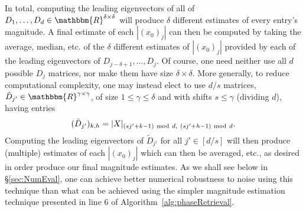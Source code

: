In total, computing the leading eigenvectors of all of $D_1, \dots, D_d \in \mathbbm{R}^{\delta \times \delta}$ will produce $\delta$ different estimates of every entry's magnitude.  A final estimate of each $|(x_0)_j|$ can then be computed by taking the average, median, etc. of the $\delta$ different estimates of $|(x_0)_j|$ provided by each of the leading eigenvectors of $D_{j-\delta+1}, \dots, D_j$.  Of course, one need neither use all $d$ possible $D_j$ matrices, nor make them have size $\delta \times \delta$.  More generally, to reduce computational complexity, one may instead elect to use $d/s$ matrices, $\tilde{D}_{j'} \in \mathbbm{R}^{\gamma \times \gamma}$, of size $1 \leq \gamma \leq \delta$ and with shifts $s \leq \gamma$ (dividing $d$), having entries
$$(\tilde{D}_{j'})_{k,h} = |X|_{(sj'+k-1)~{\rm mod}~d,~(sj'+h-1)~{\rm mod}~d}.$$
Computing the leading eigenvectors of $\tilde{D}_{j'}$ for all $j' \in [d/s]$ will then produce (multiple) estimates of each $|(x_0)_j|$ which can then be averaged, etc., as desired in order produce our final magnitude estimates.  As we shall see below in \S \ref{sec:NumEval}, one can achieve better numerical robustness to noise using this technique than what can be achieved using the simpler magnitude estimation technique presented in line 6 of Algorithm~\ref{alg:phaseRetrieval}.

